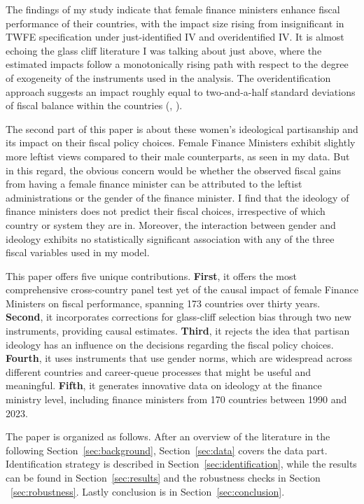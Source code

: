 \documentclass[12pt]{article}
\renewcommand{\citep}[1]{(\textit{\citeauthor{#1}}, \citeyear{#1})}
\begin{document}
The findings of my study indicate that female finance ministers enhance fiscal performance of their countries, with the impact size rising from insignificant in TWFE specification under just-identified IV and overidentified IV. It is almost echoing the glass cliff literature I was talking about just above, where the estimated impacts follow a monotonically rising path with respect to the degree of exogeneity of the instruments used in the analysis. The overidentification approach suggests an impact roughly equal to two-and-a-half standard deviations of fiscal balance within the countries \citep{alesina2019}.

The second part of this paper is about these women's ideological partisanship and its impact on their fiscal policy choices. Female Finance Ministers exhibit slightly more leftist views compared to their male counterparts, as seen in my data. But in this regard, the obvious concern would be whether the observed fiscal gains from having a female finance minister can be attributed to the leftist administrations or the gender of the finance minister. I find that the ideology of finance ministers does not predict their fiscal choices, irrespective of which country or system they are in. Moreover, the interaction between gender and ideology exhibits no statistically significant association with any of the three fiscal variables used in my model.

This paper offers five unique contributions. \textbf{First}, it offers the 
most comprehensive cross-country panel test yet of the causal impact of female 
Finance Ministers on fiscal performance, spanning 173 countries over thirty 
years. \textbf{Second}, it incorporates corrections for glass-cliff selection 
bias through two new instruments, providing causal estimates. \textbf{Third}, it rejects the idea that partisan ideology has an influence on the decisions regarding the fiscal policy choices. 
\textbf{Fourth}, it uses instruments that use gender norms, which are widespread 
across different countries and career-queue processes that might be useful and meaningful. \textbf{Fifth}, it generates innovative data on ideology at the finance ministry level, including finance ministers from 170 countries between 1990 and 2023.

The paper is organized as follows. After an overview of the literature in the following Section~\ref{sec:background}, Section~\ref{sec:data} covers the data part. Identification strategy is described in Section~\ref{sec:identification}, while the results can be found in Section~\ref{sec:results} and the robustness checks in Section ~\ref{sec:robustness}. Lastly conclusion is in Section~\ref{sec:conclusion}. 
\end{document}
